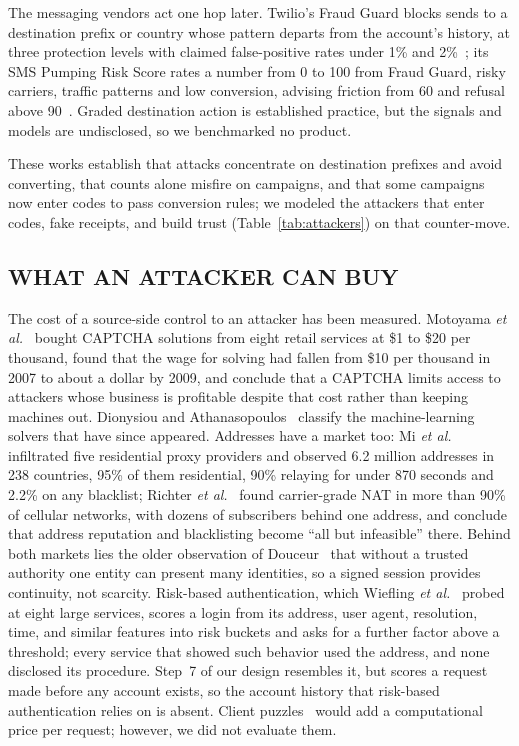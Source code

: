 \documentclass{IEEEoj}
\begin{document}
The messaging vendors act one hop later. Twilio's Fraud Guard blocks sends to a destination prefix or country whose pattern departs from the account's history, at three protection levels with claimed false-positive rates under 1\% and 2\%~\cite{twilio_fraudguard}; its SMS Pumping Risk Score rates a number from 0 to 100 from Fraud Guard, risky carriers, traffic patterns and low conversion, advising friction from 60 and refusal above 90~\cite{twilio_pumping_risk}. Graded destination action is established practice, but the signals and models are undisclosed, so we benchmarked no product.

These works establish that attacks concentrate on destination prefixes and avoid converting, that counts alone misfire on campaigns, and that some campaigns now enter codes to pass conversion rules; we modeled the attackers that enter codes, fake receipts, and build trust (Table~\ref{tab:attackers}) on that counter-move.

\subsection{WHAT AN ATTACKER CAN BUY}
The cost of a source-side control to an attacker has been measured. Motoyama \textit{et al.}~\cite{motoyama2010captcha} bought CAPTCHA solutions from eight retail services at \$1 to \$20 per thousand, found that the wage for solving had fallen from \$10 per thousand in 2007 to about a dollar by 2009, and conclude that a CAPTCHA limits access to attackers whose business is profitable despite that cost rather than keeping machines out. Dionysiou and Athanasopoulos~\cite{dionysiou2020captcha} classify the machine-learning solvers that have since appeared. Addresses have a market too: Mi \textit{et al.}~\cite{mi2019resip} infiltrated five residential proxy providers and observed 6.2 million addresses in 238 countries, 95\% of them residential, 90\% relaying for under 870 seconds and 2.2\% on any blacklist; Richter \textit{et al.}~\cite{richter2016cgn} found carrier-grade NAT in more than 90\% of cellular networks, with dozens of subscribers behind one address, and conclude that address reputation and blacklisting become ``all but infeasible'' there. Behind both markets lies the older observation of Douceur~\cite{douceur2002sybil} that without a trusted authority one entity can present many identities, so a signed session provides continuity, not scarcity. Risk-based authentication, which Wiefling \textit{et al.}~\cite{wiefling2019rba} probed at eight large services, scores a login from its address, user agent, resolution, time, and similar features into risk buckets and asks for a further factor above a threshold; every service that showed such behavior used the address, and none disclosed its procedure. Step~7 of our design resembles it, but scores a request made before any account exists, so the account history that risk-based authentication relies on is absent. Client puzzles~\cite{dean2001puzzles} would add a computational price per request; however, we did not evaluate them.
\end{document}
